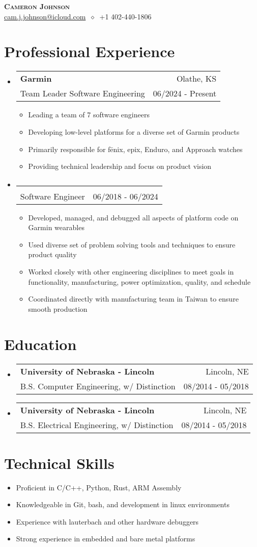 \documentclass[letterpaper,11pt]{article}
\makeatletter
\newcommand{\cvitem}[1]{
  \item\small{
    {#1\vspace{-2pt}}
  }
}
\newcommand{\cvheading}[4]{
  \vspace{-2pt}\item
    \begin{tabular*}{\textwidth}[t]{l@{\extracolsep{\fill}}r}
      \textbf{#1} & #2 \\
      \small#3 & \small#4 \\
    \end{tabular*}\vspace{-7pt}
}
\newcommand{\cvheadingstart}{\begin{itemize}[leftmargin=0in, label={}]}
\newcommand{\cvheadingend}{\end{itemize}}
\newcommand{\cvitemstart}{\begin{itemize}[label=\textopenbullet]\justifying}
\newcommand{\cvitemend}{\end{itemize}\vspace{-5pt}}
\makeatother
\begin{document}
\begin{center}
  \textbf{\LARGE\scshape Cameron Johnson} \\
  \vspace{1pt}\small
  \href{mailto:cam.j.johnson@icloud.com}{cam.j.johnson@icloud.com}
  $\ \diamond\ $ 
  +1 402-440-1806
\end{center}

\section{Professional Experience}
\cvheadingstart
  \cvheading
    {Garmin}{Olathe, KS}
    {Team Leader Software Engineering}{06/2024 - Present}
  \cvitemstart
    \cvitem{Leading a team of 7 software engineers}
    \cvitem{Developing low-level platforms for a diverse set of Garmin products}
    \cvitem{Primarily responsible for fēnix, epix, Enduro, and Approach watches}
    \cvitem{Providing technical leadership and focus on product vision}
  \cvitemend
  \cvheading
    {}{}
    {Software Engineer}{06/2018 - 06/2024}
  \cvitemstart
    \cvitem{Developed, managed, and debugged all aspects of platform code on Garmin wearables}
    \cvitem{Used diverse set of problem solving tools and techniques to ensure product
    quality}
    \cvitem{Worked closely with other engineering disciplines to meet goals in functionality,
    manufacturing, power optimization, quality, and schedule}
    \cvitem{Coordinated directly with manufacturing team in Taiwan to ensure smooth production}
  \cvitemend
\cvheadingend

\section{Education}
\cvheadingstart
  \cvheading
    {University of Nebraska - Lincoln}{Lincoln, NE}
    {B.S. Computer Engineering, w/ Distinction}{08/2014 - 05/2018}
  \cvheading
    {University of Nebraska - Lincoln}{Lincoln, NE}
    {B.S. Electrical Engineering, w/ Distinction}{08/2014 - 05/2018}
\cvheadingend

\section{Technical Skills}
\cvitemstart
    \cvitem{Proficient in C/C++, Python, Rust, ARM Assembly}
    \cvitem{Knowledgeable in Git, bash, and development in linux environments}
    \cvitem{Experience with lauterbach and other hardware debuggers}
    \cvitem{Strong experience in embedded and bare metal platforms}
\cvitemend
\vspace{-5pt}
\end{document}
